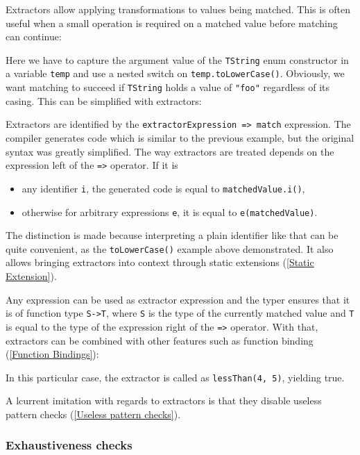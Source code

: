 \documentclass{article}
\newcommand{\type}[1]{\texttt{#1}}
\newcommand{\expr}[1]{\texttt{#1}}
\newcommand{\tref}[2]{#1 (\ref{#2})}
\newcommand{\haxe}[2][]{%
}
\begin{document}
Extractors allow applying transformations to values being matched. This is often useful when a small operation is required on a matched value before matching can continue:

\haxe{assets/Extractor2.hx}

Here we have to capture the argument value of the \expr{TString} enum constructor in a variable \expr{temp} and use a nested switch on \expr{temp.toLowerCase()}. Obviously, we want matching to succeed if \expr{TString} holds a value of \expr{"foo"} regardless of its casing. This can be simplified with extractors:

\haxe{assets/Extractor.hx}

Extractors are identified by the \expr{extractorExpression => match} expression. The compiler generates code which is similar to the previous example, but the original syntax was greatly simplified. The way extractors are treated depends on the expression left of the \expr{=>} operator. If it is

\begin{itemize}
	\item any identifier \expr{i}, the generated code is equal to \expr{matchedValue.i()},
	\item otherwise for arbitrary expressions \expr{e}, it is equal to \expr{e(matchedValue)}.
\end{itemize}

The distinction is made because interpreting a plain identifier like that can be quite convenient, as the \expr{toLowerCase()} example above demonstrated. It also allows bringing extractors into context through \tref{static extensions}{Static Extension}.

Any expression can be used as extractor expression and the typer ensures that it is of function type \type{S->T}, where \type{S} is the type of the currently matched value and \type{T} is equal to the type of the expression right of the \expr{=>} operator. With that, extractors can be combined with other features such as \tref{function binding}{Function Bindings}:

\haxe{assets/Extractor3.hx}

In this particular case, the extractor is called as \expr{lessThan(4, 5)}, yielding true.

A lcurrent imitation with regards to extractors is that they disable \tref{useless pattern checks}{Useless pattern checks}.


\subsubsection{Exhaustiveness checks}
\end{document}
